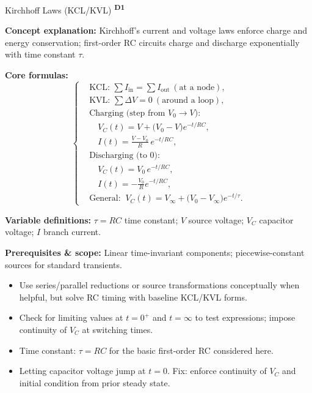 ﻿\documentclass[12pt,a4paper]{article}
\providecommand{\KPFormulas}{}
\providecommand{\KPHeuristics}{}
\newcommand{\DOne}{\texorpdfstring{\textsuperscript{\textbf{D1}}}{ D1}}
\begin{document}
\begin{KnowledgePoint}{Kirchhoff Laws (KCL/KVL) \DOne}
  \KPFormulas
  \begin{formulabox}
  \textbf{Concept explanation:} Kirchhoff's current and voltage laws enforce charge and energy conservation; first-order RC circuits charge and discharge exponentially with time constant $\tau$.

  \textbf{Core formulas:}
  \[
  \left\{\begin{aligned}
    &\text{KCL: } \sum I_{\text{in}}=\sum I_{\text{out}}\ (\text{at a node}),\\
    &\text{KVL: } \sum \Delta V=0\ (\text{around a loop}),\\
    &\text{Charging (step from }V_0\to V):\\
    &\quad V_C(t)=V+\big(V_0-V\big)e^{-t/RC},\\
    &\quad I(t)=\frac{V-V_0}{R}\,e^{-t/RC},\\
    &\text{Discharging (to 0): }\\
    &\quad V_C(t)=V_0\,e^{-t/RC},\\
    &\quad I(t)=-\frac{V_0}{R}e^{-t/RC},\\
      &\text{General: }\ V_C(t)=V_\infty+\big(V_0-V_\infty\big)e^{-t/\tau}.
  \end{aligned}\right.
  \]

  \textbf{Variable definitions:} $\tau=RC$ time constant; $V$ source voltage; $V_C$ capacitor voltage; $I$ branch current.

  \textbf{Prerequisites \& scope:} Linear time-invariant components; piecewise-constant sources for standard transients.
  \end{formulabox}

  \KPHeuristics
  \begin{heuristicsbox}
\begin{itemize}[leftmargin=*]
  \item Use series/parallel reductions or source transformations conceptually when helpful, but solve RC timing with baseline KCL/KVL forms.
  \item Check for limiting values at $t=0^+$ and $t=\infty$ to test expressions; impose continuity of $V_C$ at switching times.
  \item Time constant: $\tau=RC$ for the basic first-order RC considered here.
\end{itemize}
  \vspace{0.4em}
  \begin{itemize}[leftmargin=*]
    \item Letting capacitor voltage jump at $t=0$. Fix: enforce continuity of $V_C$ and initial condition from prior steady state.
  \end{itemize}
  \end{heuristicsbox}


\end{KnowledgePoint}
\end{document}
